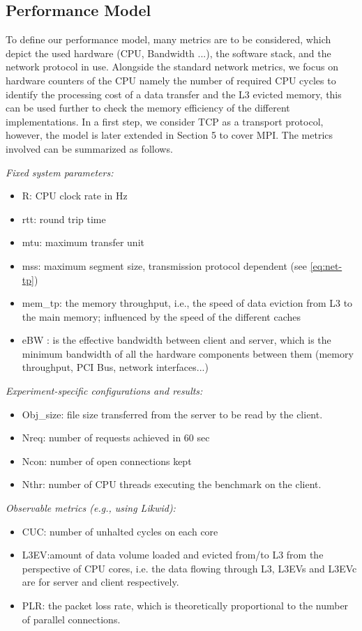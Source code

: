 \documentclass[runningheads]{llncs}
\begin{document}
\subsection{Performance Model}
To define our performance model, many metrics are to be considered, which depict the used hardware (CPU, Bandwidth ...), the software stack, and the network protocol in use. Alongside the standard network metrics, we focus on hardware counters of the CPU namely the number of required CPU cycles to identify the processing cost of a data transfer and the L3 evicted memory, this can be used further to check the memory efficiency of the different implementations. In a first step, we consider TCP as a transport protocol, however, the model is later extended in Section 5 to cover MPI. The metrics involved can be summarized as follows.

\textit{Fixed system parameters:}
\begin{itemize}
\item R: CPU clock rate in Hz
\item rtt: round trip time
\item mtu: maximum transfer unit
\item mss: maximum segment size, transmission protocol dependent (see \cref{eq:net-tp})
\item mem\_tp: the memory throughput, i.e., the speed of data eviction from L3 to the main memory; influenced by the speed of the different caches
\item eBW \cite{chang1995effective}: is the effective bandwidth between client and server, which is the minimum bandwidth of all the hardware components between them (memory throughput, PCI Bus, network interfaces...)
\end{itemize}

\textit{Experiment-specific configurations and results:}
\begin{itemize}
\item Obj\_size: file size transferred from the server to be read by the client.
\item Nreq: number of requests achieved in 60 sec
\item Ncon: number of open connections kept
\item Nthr: number of CPU threads executing the benchmark on the client.
\end{itemize}

\textit{Observable metrics (e.g., using Likwid):}
\begin{itemize}
\item CUC: number of unhalted cycles on each core %
\item L3EV:amount of data volume loaded and evicted from/to L3 from the perspective of CPU cores, i.e. the data flowing through L3\cite{l3explainedlik,intel-l3}, L3EVs and L3EVc are for server and client respectively.
\item PLR: the packet loss rate, which is theoretically proportional to the number of parallel connections. 
\end{itemize}
\end{document}
